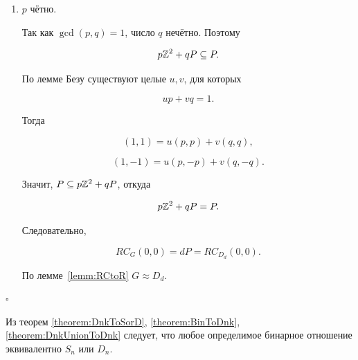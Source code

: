 \begin{enumerate}
\begin{enumerate}
        $$RC_G(0,0)=d\Int^2=RC_{S_d}(0,0).$$

        По лемме~\ref{lemm:RCtoR} $G\approx S_d.$

        \item $p$ чётно.

        Так как $\gcd(p,q)=1$, число $q$ нечётно. Поэтому

        $$p\mathbb{Z}^2+qP\subseteq P.$$

        По лемме Безу существуют целые $u,v$, для которых

        $$up+vq=1.$$

        Тогда

        $$(1,1)=u(p,p)+v(q,q),$$

        $$(1,-1)=u(p,-p)+v(q,-q).$$

        Значит, $P\subseteq p\mathbb{Z}^2+qP$, откуда

        $$p\mathbb{Z}^2+qP=P.$$

        Следовательно,

        $$RC_G(0,0)=dP=RC_{D_d}(0,0).$$

        По лемме~\ref{lemm:RCtoR} $G\approx D_d.$
    \end{enumerate}
\end{enumerate} \hfill $\square$

\begin{corollary}
    Из теорем \ref{theorem:DnkToSorD}, \ref{theorem:BinToDnk}, \ref{theorem:DnkUnionToDnk} следует, что любое определимое бинарное отношение эквивалентно $S_n$ или $D_n$.
 
\end{corollary}
